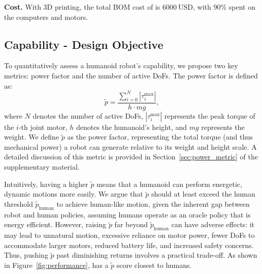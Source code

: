 \textbf{Cost.} With 3D printing, the total BOM cost of \system is $6000~\mathrm{USD}$, with 90\% spent on the computers and motors.

\subsection{Capability - Design Objective}

To quantitatively assess a humanoid robot’s capability, we propose two key metrics: power factor and the number of active DoFs.
The power factor is defined as:
\begin{equation}
    \tilde{\mathit{p}} = \frac{\sum_{i=0}^{\mathit{N}} |{\tau}^{\max}_{i}|}{{h} \cdot {mg}},
    \label{eq:performance}
\end{equation}
where $\mathit{N}$ denotes the number of active DoFs, $|{\tau}_i^{\max}|$ represents the peak torque of the $i$-th joint motor, $h$ denotes the humanoid's height, and $mg$ represents the weight. 
We define $\tilde{\mathit{p}}$ as the power factor, representing the total torque (and thus mechanical power) a robot can generate relative to its weight and height scale. A detailed discussion of this metric is provided in Section~\ref{sec:power_metric} of the supplementary material.

Intuitively, having a higher $\tilde{\mathit{p}}$ means that a humanoid can perform energetic, dynamic motions more easily. We argue that $\tilde{\mathit{p}}$ should at least exceed the human threshold $\tilde{\mathit{p}}_{\text{human}}$ to achieve human-like motion, given the inherent gap between robot and human policies, assuming humans operate as an oracle policy that is energy efficient.
However, raising $\tilde{\mathit{p}}$ far beyond $\tilde{\mathit{p}}_{\text{human}}$ can have adverse effects: it may lead to unnatural motion, excessive reliance on motor power, fewer DoFs to accommodate larger motors, reduced battery life, and increased safety concerns. Thus, pushing $\tilde{\mathit{p}}$ past diminishing returns involves a practical trade-off. As shown in Figure~\ref{fig:performance}, \system has a $\tilde{\mathit{p}}$ score closest to humans.

